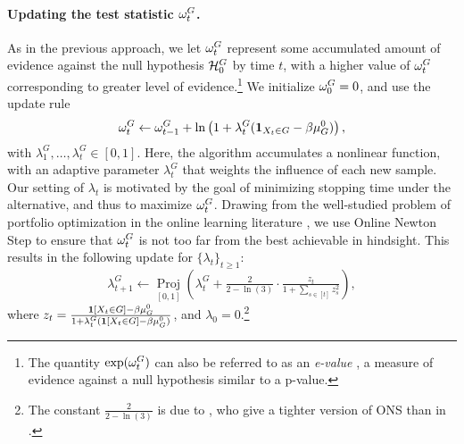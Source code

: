 \paragraph{Updating the test statistic $\Logwealth_t^G$.}
As in the previous approach, we let $\Logwealth_t^G$ represent some accumulated amount of evidence against the null hypothesis $\NullH$ by time $t$, with a higher value of $\Logwealth_t^G$ corresponding to greater level of evidence.\footnote{The quantity $\exp(\omega_t^G)$ can also be referred to as an \textit{e-value} \citep{vovk2021values}, a measure of evidence against a null hypothesis similar to a p-value.} We initialize $\omega_0^G = 0$, and use the update rule 
\begin{equation}\label{eq:wealth_update}
\omega_t^G \leftarrow \omega_{t-1}^G + \ln\left(1 + \lambda_t^G (\mathbf{1}_{X_t\in G} - \beta \mu_G^0)\right),
\end{equation}
with $\lambda_1^G, \ldots, \lambda_t^G \in [0, 1]$. 
\iftoggle{icml}{}{Note that this expression is similar to the running sum used in Section~\ref{subsec:ztest}.}
Here, the algorithm accumulates a nonlinear function, with an adaptive parameter $\lambda_t^G$ that weights the influence of each new sample. 
Our setting of $\lambda_t$ is motivated by the goal of minimizing stopping time under the alternative, and thus to maximize $\Logwealth_t^G$. 
\iftoggle{icml}{}{Taking $\lambda_{t} = 0$ means $\Logwealth_t^G$ remains the same regardless of what new information is received at time $t$. On the other hand, $\lambda_{t} = \nicefrac{1}{\beta\mu_G^0}$ means that if we receive evidence in accordance with $\NullH$ then $\Logwealth_t^G$ will decrease substantially; but, if we instead receive evidence \textit{against} the null, i.e. $X_{t}\in G$, we maximally increase $\Logwealth_{t}^G$.}
Drawing from the well-studied problem of portfolio optimization in the online learning literature \citep{cover1991universal,
zinkevich2003online, hazan2016introduction}, we use Online Newton Step \citep{hazan2007logarithmic, cutkosky2018black} to ensure that $\Logwealth_t^G$ is not too far from the best achievable in hindsight. This results in the following update for $\{\lambda_t\}_{t \geq 1}$:
\begin{equation}\label{eq:bet_update}
\lambda_{t+1}^G \gets \mathop{\text{Proj}}\limits_{\left[0, 1\right]}\left(\lambda_t^G + \tfrac{2}{2- \ln(3)}\cdot\tfrac{z_t}{1 + \sum_{s \in [t]}z_{s}^2}
   \right),
\end{equation}
where $z_t = \frac{\mathbf{1}[X_t\in G ]- \beta {\mu_G^0}}{1 + \lambda_t^G(\mathbf{1}[X_t\in G]- \beta {\mu_G^0})}$, and $\lambda_0 = 0$.\footnote{The constant $\frac
{2}{2 - \ln(3)}$ is due to \citet{cutkosky2018black}, who give a tighter version of ONS than in \citet{hazan2007logarithmic}.}

